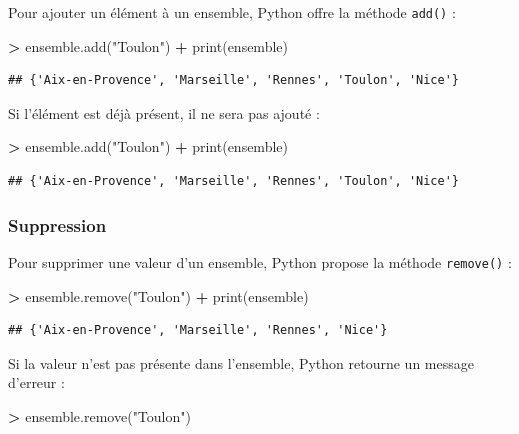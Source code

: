 \documentclass[12pt,]{book}
\newenvironment{Shaded}{\begin{snugshade}}{\end{snugshade}}
\newcommand{\StringTok}[1]{\textcolor[rgb]{0.31,0.60,0.02}{#1}}
\newcommand{\OperatorTok}[1]{\textcolor[rgb]{0.81,0.36,0.00}{\textbf{#1}}}
\newcommand{\BuiltInTok}[1]{#1}
\newcommand{\NormalTok}[1]{#1}
\numberwithin{equation}{section}
\numberwithin{countremarque}{section}
\begin{document}
Pour ajouter un élément à un ensemble, Python offre la méthode
\texttt{add()} :

\begin{Shaded}
\begin{Highlighting}[]
\OperatorTok{>}\NormalTok{ ensemble.add(}\StringTok{"Toulon"}\NormalTok{)}
\OperatorTok{+} \BuiltInTok{print}\NormalTok{(ensemble)}
\end{Highlighting}
\end{Shaded}

\begin{lstlisting}
## {'Aix-en-Provence', 'Marseille', 'Rennes', 'Toulon', 'Nice'}
\end{lstlisting}

Si l'élément est déjà présent, il ne sera pas ajouté :

\begin{Shaded}
\begin{Highlighting}[]
\OperatorTok{>}\NormalTok{ ensemble.add(}\StringTok{"Toulon"}\NormalTok{)}
\OperatorTok{+} \BuiltInTok{print}\NormalTok{(ensemble)}
\end{Highlighting}
\end{Shaded}

\begin{lstlisting}
## {'Aix-en-Provence', 'Marseille', 'Rennes', 'Toulon', 'Nice'}
\end{lstlisting}

\subsubsection{Suppression}\label{suppression}

Pour supprimer une valeur d'un ensemble, Python propose la méthode
\texttt{remove()} :

\begin{Shaded}
\begin{Highlighting}[]
\OperatorTok{>}\NormalTok{ ensemble.remove(}\StringTok{"Toulon"}\NormalTok{)}
\OperatorTok{+} \BuiltInTok{print}\NormalTok{(ensemble)}
\end{Highlighting}
\end{Shaded}

\begin{lstlisting}
## {'Aix-en-Provence', 'Marseille', 'Rennes', 'Nice'}
\end{lstlisting}

Si la valeur n'est pas présente dans l'ensemble, Python retourne un
message d'erreur :

\begin{Shaded}
\begin{Highlighting}[]
\OperatorTok{>}\NormalTok{ ensemble.remove(}\StringTok{"Toulon"}\NormalTok{)}
\end{Highlighting}
\end{Shaded}
\end{document}
